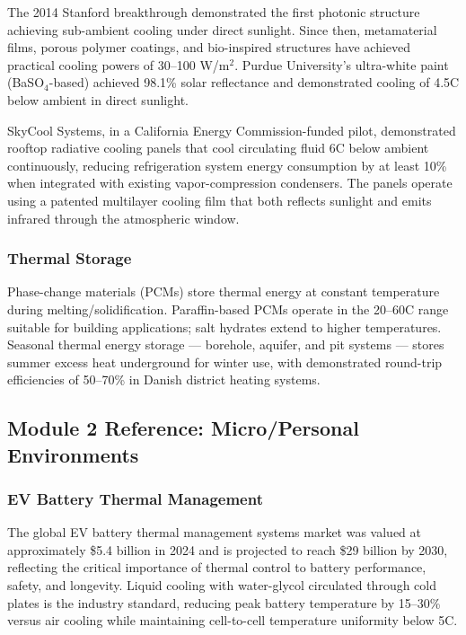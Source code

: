 \documentclass[11pt,letterpaper]{article}
\begin{document}
The 2014 Stanford breakthrough demonstrated the first photonic structure achieving sub-ambient cooling under direct sunlight. Since then, metamaterial films, porous polymer coatings, and bio-inspired structures have achieved practical cooling powers of 30--100 W/m$^{2}$. Purdue University's ultra-white paint (BaSO$_4$-based) achieved 98.1\% solar reflectance and demonstrated cooling of 4.5\textdegree C below ambient in direct sunlight.

SkyCool Systems, in a California Energy Commission-funded pilot, demonstrated rooftop radiative cooling panels that cool circulating fluid 6\textdegree C below ambient continuously, reducing refrigeration system energy consumption by at least 10\% when integrated with existing vapor-compression condensers. The panels operate using a patented multilayer cooling film that both reflects sunlight and emits infrared through the atmospheric window.

\subsubsection{Thermal Storage}
Phase-change materials (PCMs) store thermal energy at constant temperature during melting/solidification. Paraffin-based PCMs operate in the 20--60\textdegree C range suitable for building applications; salt hydrates extend to higher temperatures. Seasonal thermal energy storage --- borehole, aquifer, and pit systems --- stores summer excess heat underground for winter use, with demonstrated round-trip efficiencies of 50--70\% in Danish district heating systems.

\subsection{Module 2 Reference: Micro/Personal Environments}

\subsubsection{EV Battery Thermal Management}
The global EV battery thermal management systems market was valued at approximately \$5.4 billion in 2024 and is projected to reach \$29 billion by 2030, reflecting the critical importance of thermal control to battery performance, safety, and longevity. Liquid cooling with water-glycol circulated through cold plates is the industry standard, reducing peak battery temperature by 15--30\% versus air cooling while maintaining cell-to-cell temperature uniformity below 5\textdegree C.
\end{document}
